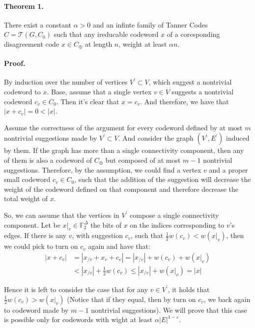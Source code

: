 \documentclass{article}
\newcommand{ \Tann } {  \mathcal{T}\left( G, C_0 \right) }
\begin{document}
\begin{multicols*}{2}
  \paragraph{Theorem 1.} There exist a constant $\alpha > 0$ and an infinte family of Tanner Codes $C = \Tann$ such that any ireducable codeword $x$ of a coresponding disagreement code $x \in C_{\oplus}$ at length $n$, weight at least $\alpha n$.
  \paragraph{Proof.} By induction over the number of vertices $V^\prime \subset V$, which suggest a nontrivial codeword to $x$. Base, assume that a single vertex $v \in V$ suggests a nontrivial codeword $c_{v} \in C_{0}$. Then it's clear that $x = c_{v}$. And therefore, we have that $|x +c_{v}| = 0 < |x|$.

  Assume the correctness of the argument for every codeword defined by at most $m$ nontrivial suggestions made by $V^\prime \subset V$. And consider the graph $\left( V^\prime, E^\prime \right)$ induced by them. If the graph has more than a single connectivity component, then any of them is also a codeword of $C_{\oplus}$  but composed of at most $m-1$ nontrivial suggestions. Therefore, by the assumption, we could find a vertex $v$ and a proper small codeword $c_v \in C_0 $, such that the addition of the suggestion will decrease the weight of the codeword defined on that component and therefore decrease the total weight of $x$.

  So, we can assume that the vertices in $V^\prime$ compose a single connectivity component. Let be $x|_{v} \in \mathbb{F}_{2}^{\Delta}$ the bits of $x$ on the indices corresponding to $v$'s edges. If there is any $v$, with suggestion $c_{v}$, such that $ \frac{1}{2}w\left( c_{v}\right) < w\left( x|_{v} \right)$, then we could pick to turn on $c_{v}$ again and have that:
  \begin{equation*}
    \begin{split}
      |x+c_{v}| & = | x_{/v} + x_{v} + c_{v}| = |x_{/v}| + w\left( c_{v} \right) + w\left( x|_{v} \right) \\
      & < |x_{/v}| + \frac{1}{2}w\left( c_{v} \right) \le |x_{/v}| + w\left( x|_{v} \right) = |x|
    \end{split}
  \end{equation*}

  Hence it is left to consider the case that for any $v\in V^\prime$, it holds that $\frac{1}{2}w\left( c_{v}\right) >  w\left( x|_{v} \right)$ (Notice that if they equal, then by turn on $c_{v}$, we back again to codeword made by $m-1$ nontrivial suggestions). We will prove that this case is possible only for codewords with wight at least $\alpha|E|^{1-\varepsilon}$.


\end{multicols*}
\end{document}
